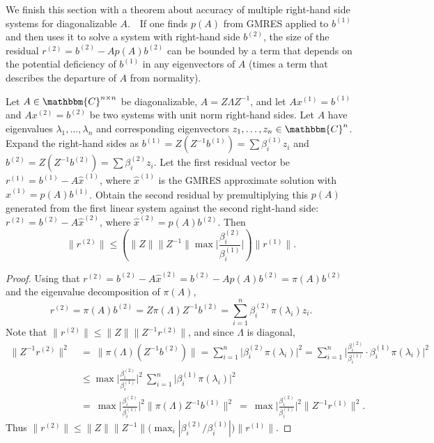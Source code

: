 \documentclass{siamart}
\def\C{\mathbbm{C}}
\def\wh#1{\widehat{#1}}
\begin{document}
We finish this section with a theorem about accuracy of multiple right-hand side systems for diagonalizable $A$.\ \ If one finds $p(A)$ from GMRES applied to $b^{(1)}$ and then uses it to solve a system with right-hand side $b^{(2)}$, the size of the residual $r^{(2)} = b^{(2)}-Ap(A)b^{(2)}$ can be bounded by a term that depends on the potential deficiency of $b^{(1)}$ in any eigenvectors of $A$ (times a term that describes the departure of $A$ from normality).


\begin{theorem}
    Let $A\in\C^{n\times n}$ be diagonalizable, $A = Z \Lambda Z^{-1}$, and let $Ax^{(1)}=b^{(1)}$ and $Ax^{(2)}=b^{(2)}$ be two  systems with unit norm right-hand sides.  Let $A$ have eigenvalues $\lambda_1, \ldots, \lambda_n$ 
    and corresponding eigenvectors $z_1, \ldots, z_n\in\C^n$.  Expand the right-hand sides as $b^{(1)} = Z(Z^{-1}b^{(1)}) = \sum\beta_i^{(1)} z_i$ and $b^{(2)} = Z(Z^{-1}b^{(2)}) = \sum\beta_i^{(2)} z_i$.  Let the first residual vector be $r^{(1)} = b^{(1)} - A \wh{x}^{(1)}$, where $\wh{x}^{(1)}$ is the GMRES approximate solution with $\wh{x}^{(1)} = p(A)b^{(1)}$. 
    Obtain the second residual by premultiplying this $p(A)$ generated from the first linear system against the second right-hand side: $r^{(2)} = b^{(2)}-A \wh{x}^{(2)}$, where $\wh{x}^{(2)}  = p(A)b^{(2)}$. Then 
    \[    \|r^{(2)}\| \leq  \left(\|Z\| \|Z^{-1}\| \max\bigg|\frac{\beta_i ^{(2)}}{\beta_i ^{(1)}}\bigg|\right) \|r^{(1)}\|.\]
\end{theorem}

\begin{proof}
Using that $r^{(2)} = b^{(2)}-A \widehat{x}^{(2)} = b^{(2)}-A p(A)b^{(2)} = \pi(A)b^{(2)}$ and the eigenvalue decomposition of $\pi(A)$,
\begin{equation} \label{eq:r1}
r^{(2)} = \pi(A)b^{(2)} 
= Z\pi(\Lambda)Z^{-1} b^{(2)} 
= \sum_{i=1}^n \beta_i ^{(2)} \pi(\lambda_i)z_i.
\end{equation}
Note that $\|r^{(2)}\| \le \|Z\| \|Z^{-1} r^{(2)}\|$, and since $\Lambda$ is diagonal, 
\begin{align*}
\|Z^{-1}r^{(2)}\|^2 \ &=\  
\|\pi(\Lambda) (Z^{-1}b^{(2)})\| 
 = \sum_{i=1}^n \big| \beta_i^{(2)} \pi(\lambda_i)  \big|^2 
= \sum_{i=1}^n \bigg| \frac{\beta_i^{(2)}}{\beta_i^{(1)}}\cdot \beta_i^{(1)} \pi(\lambda_i)\bigg|^2 \\
&\leq \max\bigg|\frac{\beta_i ^{(2)}}{\beta_i ^{(1)}}\bigg|^2\ \sum_{i=1}^n \big|\beta_i^{(1)} \pi(\lambda_i) \big|^2 \\ 
\ &=\ \max\bigg|\frac{\beta_i ^{(2)}}{\beta_i ^{(1)}}\bigg|^2 \|\pi(\Lambda) Z^{-1} b^{(1)}\|^2
\ =\ \max\bigg|\frac{\beta_i ^{(2)}}{\beta_i ^{(1)}}\bigg|^2 \|Z^{-1} r^{(1)}\|^2.
\end{align*} 
Thus $\|r^{(2)}\| \le 
\|Z\| \|Z^{-1}\| \big(\max_i |\beta_i^{(2)}/\beta_i^{(1)}|\big) \|r^{(1)}\|.$
\end{proof}
\end{document}
